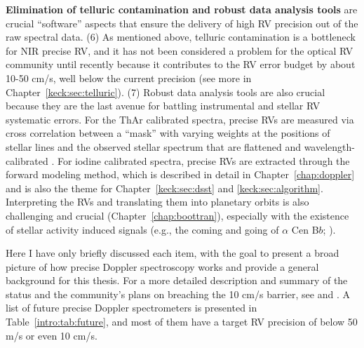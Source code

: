 {\bf Elimination of telluric contamination and robust data analysis
tools} are crucial ``software'' aspects that ensure the delivery of
high RV precision out of the raw spectral data. (6) As mentioned
above, telluric contamination is a bottleneck for NIR precise RV, and
it has not been considered a problem for the optical RV community
until recently because it contributes to the RV error budget by about
10-50 cm/s, well below the current precision (see more in
Chapter~\ref{keck:sec:telluric}). (7) Robust data analysis tools are
also crucial because they are the last avenue for battling instrumental
and stellar RV systematic errors. For the ThAr calibrated spectra,
precise RVs are measured via cross correlation between a ``mask'' with
varying weights at the positions of stellar lines and the observed
stellar spectrum that are flattened and wavelength-calibrated
\citep{elodie,2002Msngr.110....9P}. For iodine calibrated spectra,
precise RVs are extracted through the forward modeling method, which
is described in detail in Chapter~\ref{chap:doppler} and is also the
theme for Chapter~\ref{keck:sec:dsst} and
\ref{keck:sec:algorithm}. Interpreting the RVs and translating them
into planetary orbits is also challenging and crucial
(Chapter~\ref{chap:boottran}), especially with the existence of
stellar activity induced signals (e.g., the coming and going of
$\alpha$ Cen B$b$; \citealt{2012Natur.491..207D,
2016MNRAS.456L...6R}).

Here I have only briefly discussed each item, with the goal to present
a broad picture of how precise Doppler spectroscopy works and provide
a general background for this thesis. For a more detailed description
and summary of the status and the community's plans on breaching the
10 cm/s barrier, see \cite{exopag2015} and \cite{eprv2015}. A list of
future precise Doppler spectrometers is presented in
Table~\ref{intro:tab:future}, and most of them have a target RV
precision of below 50 m/s or even 10 cm/s.


